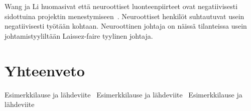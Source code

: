 \documentclass[finnish]{tktltiki2}
\theoremstyle{definition}
\theoremstyle{remark}
\begin{document}
Wang ja Li huomasivat että neuroottiset luonteenpiirteet ovat negatiivisesti sidottuina projektin menestymiseen~\cite{Wang:2009:PMP:1639950.1640049}. Neuroottiset henkilöt suhtautuvat usein negatiivisesti työtään kohtaan. Neuroottinen johtaja on näissä tilanteissa usein johtamistyyliltään Laissez-faire tyylinen johtaja.

    




\section{Yhteenveto}







 





Esimerkkilause ja lähdeviite~\cite{Zhang:2011:ECL:2047594.2047666}
Esimerkkilause ja lähdeviite~\cite{Dhomne:2012:ITL:2382887.2382899}
Esimerkkilause ja lähdeviite~\cite{Li:2006:MOS:1125170.1125182}






%

%
% 
%



\end{document}
